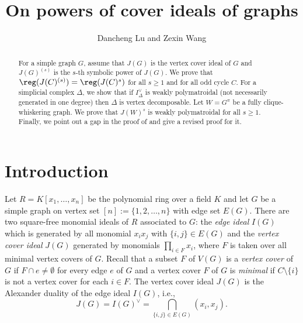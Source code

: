\documentclass[12pt]{amsart}
\begin{document}
 \title{On  powers of  cover ideals of  graphs}

 \author {Dancheng Lu and Zexin Wang}


 \begin{abstract} For a simple graph $G$, assume that $J(G)$ is the vertex cover ideal of $G$ and $J(G)^{(s)}$ is the $s$-th symbolic power of $J(G)$. We  prove that $\reg(J(C)^{(s)})=\reg(J(C)^s)$ for all $s\geq 1$  and for all odd cycle $C$. For a simplicial complex $\Delta$, we show that  if $I_{\Delta}^{\vee}$ is weakly polymatroidal (not necessarily generated in one degree) then  $\Delta$ is vertex decomposable. Let $W=G^{\pi}$ be a fully clique-whiskering graph. We prove that $J(W)^s$ is weakly polymatroidal for all $s\geq 1$. Finally, we point out a gap in the proof of \cite[Theorem 4.3]{M} and give a revised proof for it.
 \end{abstract}


\address{Dancheng Lu, School of Mathematics Science, Soochow University, P.R.China} 
\address{Zexin Wang,  School of Mathematics Science, Soochow University, P.R.China} 

 \maketitle

\section{Introduction}








Let $R=K[x_1,\ldots,x_n]$ be the polynomial ring over a field $K$ and let $G$ be a simple graph on vertex set $[n]:=\{1,2,\ldots,n\}$ with edge set $E(G)$. There are two square-free monomial ideals of $R$ associated to $G$: the {\it edge ideal} $I(G)$ which is generated by all monomial $x_ix_j$ with $\{i,j\}\in E(G)$ and the {\it vertex cover ideal} $J(G)$ generated by monomials $\prod_{i\in F}x_i$, where $F$ is taken over all  minimal vertex covers of $G$. Recall that  a subset $F$ of $V(G)$ is a {\it vertex cover} of $G$ if $F\cap e\neq \emptyset$ for every edge $e$ of $G$ and a vertex cover $F$ of $G$ is {\it minimal} if $C\setminus \{i\}$ is not a vertex cover for each $i\in F$. The vertex cover ideal $J(G)$ is the Alexander duality of the edge ideal $I(G)$, i.e., $$J(G)=I(G)^{\vee}=\bigcap_{\{i,j\}\in E(G)}(x_i,x_j).$$
\end{document}
